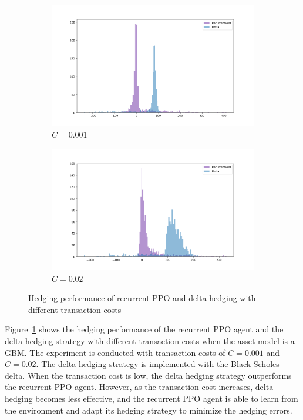 \begin{figure}[ht!]
    \centering
    \begin{subfigure}{0.45\textwidth}
        \includegraphics[width=\textwidth]{./futureWork/figures/PPO_cost_001.png}
        \caption{$C = 0.001$}
    \end{subfigure}
    \hspace{1cm}
    \begin{subfigure}{0.45\textwidth}
        \includegraphics[width=\textwidth]{./futureWork/figures/PPO_cost_02.png}
        \caption{$C = 0.02$}
    \end{subfigure}
    \caption{Hedging performance of recurrent PPO and delta hedging with different transaction costs} 
    \label{fig3:ppo_cost}
\end{figure}

Figure~\ref{fig3:ppo_cost} shows the hedging performance of the recurrent PPO agent and the delta hedging strategy with different transaction costs when the asset model is a GBM.
The experiment is conducted with transaction costs of $C=0.001$ and $C=0.02$.
The delta hedging strategy is implemented with the Black-Scholes delta.
When the transaction cost is low, the delta hedging strategy outperforms the recurrent PPO agent.
However, as the transaction cost increases, delta hedging becomes less effective, and the recurrent PPO agent is able to learn from the environment and adapt its hedging strategy to minimize the hedging errors.

